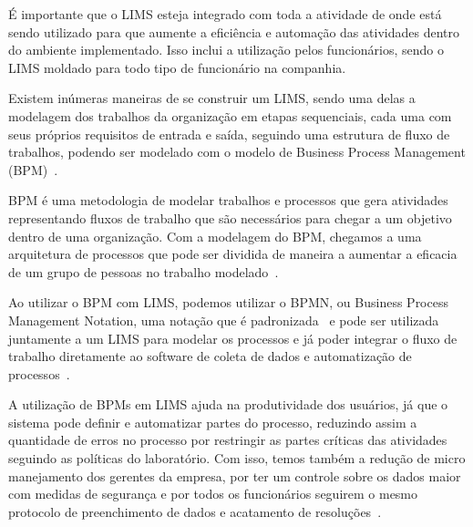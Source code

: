 
É importante que o LIMS esteja integrado com toda a atividade de onde está sendo utilizado para que aumente a eficiência e automação das atividades dentro do ambiente implementado. Isso inclui a utilização pelos funcionários, sendo o LIMS moldado para todo tipo de funcionário na companhia.

Existem inúmeras maneiras de se construir um LIMS, sendo uma delas a modelagem dos trabalhos da organização em etapas sequenciais, cada uma com seus próprios requisitos de entrada e saída, seguindo uma estrutura de fluxo de trabalhos, podendo ser modelado com o modelo de Business Process Management (BPM)~\cite{Holzmuller-Laue2014ImprovedAutomation}.

BPM é uma metodologia de modelar trabalhos e processos que gera atividades representando fluxos de trabalho que são necessários para chegar a um objetivo dentro de uma organização. Com a modelagem do BPM, chegamos a uma arquitetura de processos que pode ser dividida de maneira a aumentar a eficacia de um grupo de pessoas no trabalho modelado~\cite{Hammer2015WhatManagement}.


Ao utilizar o BPM com LIMS, podemos utilizar o BPMN, ou Business Process Management Notation, uma notação que é padronizada~\cite{Chinosi2012BPMN:Standard} e pode ser utilizada juntamente a um LIMS para modelar os processos e já poder integrar o fluxo de trabalho diretamente ao software de coleta de dados e automatização de processos~\cite{Holzmuller-Laue2013AAutomation}.


A utilização de BPMs em LIMS ajuda na produtividade dos usuários, já que o sistema pode definir e automatizar partes do processo, reduzindo assim a quantidade de erros no processo por restringir as partes críticas das atividades seguindo as políticas do laboratório.
Com isso, temos também a redução de micro manejamento dos gerentes da empresa, por ter um controle sobre os dados maior com medidas de segurança e por todos os funcionários seguirem o mesmo protocolo de preenchimento de dados e acatamento de resoluções~\cite{BenefitsManagement}.


